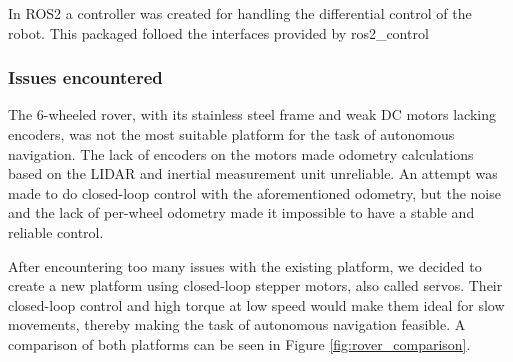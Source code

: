 \documentclass[11pt]{article}
\begin{document}
        In ROS2 a controller was created for handling the differential control of the robot. This packaged folloed the interfaces provided by ros2\_control
        

        \subsubsection{Issues encountered}
            

        The 6-wheeled rover, with its stainless steel frame and weak DC motors lacking encoders, was not the most suitable platform for the task of autonomous navigation. The lack of encoders on the motors made odometry calculations based on the LIDAR and inertial measurement unit unreliable. An attempt was made to do closed-loop control with the aforementioned odometry, but the noise and the lack of per-wheel odometry made it impossible to have a stable and reliable control.

        After encountering too many issues with the existing platform, we decided to create a new platform using closed-loop stepper motors, also called servos. Their closed-loop control and high torque at low speed would make them ideal for slow movements, thereby making the task of autonomous navigation feasible. A comparison of both platforms can be seen in Figure \ref{fig:rover_comparison}.
\end{document}
